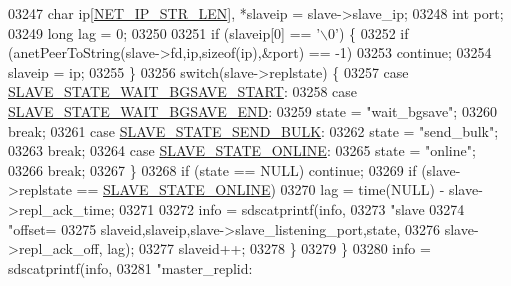 \begin{DoxyCode}
{{{{{{{{{{{{{{{{{{{{{{{{{{{{{{{{{{{{{{{{{{{{{{{{{{{{{{{{{{{{{{{{{{{{{{{{{{{{{{{{{{{{{{{{{{{{{{{{{{{{{{{{{{{{{{{{{{{{{{{{{{{{{{{{{{{{{{{{{{{{{{{{{{{{{{{{03247                 \textcolor{keywordtype}{char} ip[\hyperlink{server_8h_ad97c5405ed22a94e9fcc10fba577d6c0}{NET\_IP\_STR\_LEN}], *slaveip = slave->slave\_ip;
03248                 \textcolor{keywordtype}{int} port;
03249                 \textcolor{keywordtype}{long} lag = 0;
03250 
03251                 \textcolor{keywordflow}{if} (slaveip[0] == \textcolor{stringliteral}{'\(\backslash\)0'}) \{
03252                     \textcolor{keywordflow}{if} (anetPeerToString(slave->fd,ip,\textcolor{keyword}{sizeof}(ip),&port) == -1)
03253                         \textcolor{keywordflow}{continue};
03254                     slaveip = ip;
03255                 \}
03256                 \textcolor{keywordflow}{switch}(slave->replstate) \{
03257                 \textcolor{keywordflow}{case} \hyperlink{server_8h_a170ee2dd8cfefaf0d112edcc3152f8d7}{SLAVE\_STATE\_WAIT\_BGSAVE\_START}:
03258                 \textcolor{keywordflow}{case} \hyperlink{server_8h_a2a1b586e8f326f831f6ab466c8c3f38a}{SLAVE\_STATE\_WAIT\_BGSAVE\_END}:
03259                     state = \textcolor{stringliteral}{"wait\_bgsave"};
03260                     \textcolor{keywordflow}{break};
03261                 \textcolor{keywordflow}{case} \hyperlink{server_8h_ada38427ad2d0c09875081868a53cc51f}{SLAVE\_STATE\_SEND\_BULK}:
03262                     state = \textcolor{stringliteral}{"send\_bulk"};
03263                     \textcolor{keywordflow}{break};
03264                 \textcolor{keywordflow}{case} \hyperlink{server_8h_ad895fdf16e5ed5275d19ddf8578b900f}{SLAVE\_STATE\_ONLINE}:
03265                     state = \textcolor{stringliteral}{"online"};
03266                     \textcolor{keywordflow}{break};
03267                 \}
03268                 \textcolor{keywordflow}{if} (state == NULL) \textcolor{keywordflow}{continue};
03269                 \textcolor{keywordflow}{if} (slave->replstate == \hyperlink{server_8h_ad895fdf16e5ed5275d19ddf8578b900f}{SLAVE\_STATE\_ONLINE})
03270                     lag = time(NULL) - slave->repl\_ack\_time;
03271 
03272                 info = sdscatprintf(info,
03273                     \textcolor{stringliteral}{"slave%
03274                     \textcolor{stringliteral}{"offset=%
03275                     slaveid,slaveip,slave->slave\_listening\_port,state,
03276                     slave->repl\_ack\_off, lag);
03277                 slaveid++;
03278             \}
03279         \}
03280         info = sdscatprintf(info,
03281             \textcolor{stringliteral}{"master\_replid:%
}}}}}}}}}}}}}}}}}}}}}}}}}}}}}}}}}}}}}}}}}}}}}}}}}}}}}}}}}}}}}}}}}}}}}}}}}}}}}}}}}}}}}}}}}}}}}}}}}}}}}}}}}}}}}}}}}}}}}}}}}}}}}}}}}}}}}}}}}}}}}}}}}}}}}}}}}}}
\end{DoxyCode}
